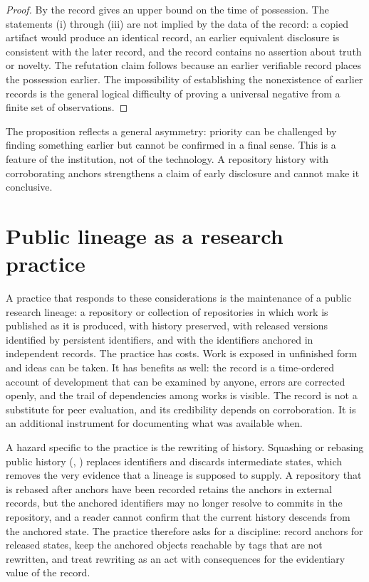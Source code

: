 \documentclass[11pt,twoside,openright]{book}
\theoremstyle{plain}
\theoremstyle{definition}
\theoremstyle{remark}
\begin{document}
\begin{proof}
By  the record gives an upper bound on the time of possession. The statements (i) through (iii) are not implied by the data of the record: a copied artifact would produce an identical record, an earlier equivalent disclosure is consistent with the later record, and the record contains no assertion about truth or novelty. The refutation claim follows because an earlier verifiable record places the possession earlier. The impossibility of establishing the nonexistence of earlier records is the general logical difficulty of proving a universal negative from a finite set of observations.
\end{proof}

The proposition reflects a general asymmetry: priority can be challenged by finding something earlier but cannot be confirmed in a final sense. This is a feature of the institution, not of the technology. A repository history with corroborating anchors strengthens a claim of early disclosure and cannot make it conclusive.

\section{Public lineage as a research practice}

A practice that responds to these considerations is the maintenance of a public research lineage: a repository or collection of repositories in which work is published as it is produced, with history preserved, with released versions identified by persistent identifiers, and with the identifiers anchored in independent records. The practice has costs. Work is exposed in unfinished form and ideas can be taken. It has benefits as well: the record is a time-ordered account of development that can be examined by anyone, errors are corrected openly, and the trail of dependencies among works is visible. The record is not a substitute for peer evaluation, and its credibility depends on corroboration. It is an additional instrument for documenting what was available when.

A hazard specific to the practice is the rewriting of history. Squashing or rebasing public history (, ) replaces identifiers and discards intermediate states, which removes the very evidence that a lineage is supposed to supply. A repository that is rebased after anchors have been recorded retains the anchors in external records, but the anchored identifiers may no longer resolve to commits in the repository, and a reader cannot confirm that the current history descends from the anchored state. The practice therefore asks for a discipline: record anchors for released states, keep the anchored objects reachable by tags that are not rewritten, and treat rewriting as an act with consequences for the evidentiary value of the record.
\end{document}

